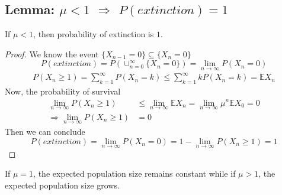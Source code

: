 \documentclass[11pt]{elegantbook}
\begin{document}
\subsection{Lemma: $\mu<1$ $\Rightarrow$ $P(extinction)=1$}
\begin{lemma}
    If $\mu < 1$, then probability of extinction is $1$.
\end{lemma}
\begin{proof}
    We know the event $\{X_{n-1}=0\}\subseteq \{X_{n}=0\}$
    $$P(extinction)=P(\cup_{n=0}^\infty\{X_n=0\})=\lim_{n \rightarrow \infty}P(X_n=0)$$
    \begin{equation}
        \begin{aligned}
            P(X_n\geq 1)=\sum_{k=1}^\infty P(X_n=k)\leq \sum_{k=1}^\infty kP(X_n=k)= \mathbb{E}X_n
        \end{aligned}
        \nonumber
    \end{equation}
    Now, the probability of survival
    \begin{equation}
        \begin{aligned}
            \lim_{n \rightarrow \infty}P(X_n\geq 1)&\leq \lim_{n \rightarrow \infty} \mathbb{E}X_n=\lim_{n \rightarrow \infty} \mu^n \mathbb{E}X_0=0\\
            \Rightarrow \lim_{n \rightarrow \infty}P(X_n\geq 1)&=0
        \end{aligned}
        \nonumber
    \end{equation}
    Then we can conclude $$P(extinction)=\lim_{n \rightarrow \infty}P(X_n=0)=1-\lim_{n \rightarrow \infty}P(X_n\geq 1)=1$$
\end{proof}

If $\mu = 1$, the expected population size remains constant while if $\mu > 1$, the expected population size grows.
\end{document}
